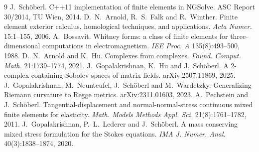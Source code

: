 \documentclass[10pt,a4paper]{article}
\begin{document}
{\small
\begin{thebibliography}{9}\setlength\itemsep{1pt}
 J.~Sch\"oberl. C++11 implementation of finite elements in NGSolve. ASC Report 30/2014, TU Wien, 2014.
 D.~N.~Arnold, R.~S.~Falk and R.~Winther. Finite element exterior calculus, homological techniques, and applications. \emph{Acta Numer.} 15:1--155, 2006.
 A.~Bossavit. Whitney forms: a class of finite elements for three-dimensional computations in electromagnetism. \emph{IEE Proc. A} 135(8):493--500, 1988.
 D.~N.~Arnold and K.~Hu. Complexes from complexes. \emph{Found. Comput. Math.} 21:1739--1774, 2021.
 J.~Gopalakrishnan, K.~Hu and J.~Sch\"oberl. A 2-complex containing Sobolev spaces of matrix fields. arXiv:2507.11869, 2025.
 J.~Gopalakrishnan, M.~Neunteufel, J.~Sch\"oberl and M.~Wardetzky. Generalizing Riemann curvature to Regge metrics. arXiv:2311.01603, 2023.
 A.~Pechstein and J.~Sch\"oberl. Tangential-displacement and normal-normal-stress continuous mixed finite elements for elasticity. \emph{Math. Models Methods Appl. Sci.} 21(8):1761--1782, 2011.
 J.~Gopalakrishnan, P.~L.~Lederer and J.~Sch\"oberl. A mass conserving mixed stress formulation for the Stokes equations. \emph{IMA J. Numer. Anal.} 40(3):1838--1874, 2020.
\end{thebibliography}}
\end{document}
